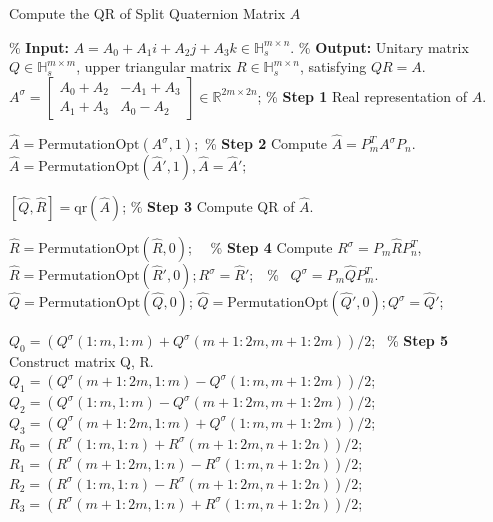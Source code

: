 \documentclass{book}
\theoremstyle{remark}
\begin{document}
\begin{algorithm}[htbp] 
    \caption{Compute the QR of Split Quaternion Matrix \(A\)}
    \label{alg:QR}
    \begin{algorithmic}[1]
        \State \% \textbf{Input:} \(A = A_0 + A_1 i + A_2 j + A_3 k \in \mathbb{H}_s^{m\times n}\).
        \State \% \textbf{Output:} Unitary matrix \(Q \in \mathbb{H}_s^{m\times m}\), upper triangular matrix \(R \in \mathbb{H}_s^{m\times n}\), satisfying \(Q  R = A\).
        \State \(A^\sigma = \begin{bmatrix}
            A_0 + A_2 & -A_1 + A_3 \\ 
            A_1 + A_3 & A_0 - A_2
            \end{bmatrix} \in \mathbb{R}^{2m\times 2n}\); \qquad\qquad\qquad\qquad \% \textbf{Step 1} Real representation of $A$.
        
        \State $\widehat{A}=\text{PermutationOpt}(A^\sigma,1);$  \qquad\qquad\qquad\qquad\qquad\qquad\quad\% \textbf{Step 2} Compute \(\widehat{A} = P_{m}^T A^\sigma P_{n}\).
        \State $\widehat{A}=\text{PermutationOpt}(\widehat{A}',1),\widehat{A}=\widehat{A}';$
        
        \State \([\widehat{Q},\widehat{R}] = \text{qr}(\widehat{A})\); \qquad\qquad\qquad\qquad\qquad\qquad\qquad\qquad\qquad\quad\% \textbf{Step 3} Compute QR of $\widehat{A}$.
        
        \State $\widehat{R}=\text{PermutationOpt}(\widehat{R},0)$; \qquad\qquad\qquad\qquad\qquad\qquad\quad\ \ \% \textbf{Step 4} Compute \(R^\sigma = P_{m}\widehat{R}P_{n}^T\), 
        \State $\widehat{R}=\text{PermutationOpt}(\widehat{R}',0);R^\sigma=\widehat{R}'$;\qquad\qquad\qquad\qquad\quad\ \ \% \qquad\quad \ \(Q^\sigma = P_{m}\widehat{Q}P_{m}^T\).
        \State $\widehat{Q}=\text{PermutationOpt}(\widehat{Q},0)$;
        \State $\widehat{Q}=\text{PermutationOpt}(\widehat{Q}',0);Q^\sigma=\widehat{Q}'$;
        
        \State $Q_0 = (Q^\sigma(1\!:\!m,1\!:\!m) + Q^\sigma(m+1\!:\!2m,m+1\!:\!2m))/2$; \qquad\ \% \textbf{Step 5} Construct matrix Q, R.
        \State $Q_1 = (Q^\sigma(m+1\!:\!2m,1\!:\!m) - Q^\sigma(1\!:\!m,m+1\!:\!2m))/2$;
        \State $Q_2 = (Q^\sigma(1\!:\!m,1\!:\!m) - Q^\sigma(m+1\!:\!2m,m+1\!:\!2m))/2$;
        \State $Q_3 = (Q^\sigma(m+1\!:\!2m,1\!:\!m) + Q^\sigma(1\!:\!m,m+1\!:\!2m))/2$;
        \State $R_0 = (R^\sigma(1\!:\!m,1\!:\!n) + R^\sigma(m+1\!:\!2m,n+1\!:\!2n))/2$;
        \State $R_1 = (R^\sigma(m+1\!:\!2m,1\!:\!n) - R^\sigma(1\!:\!m,n+1\!:\!2n))/2$;
        \State $R_2 = (R^\sigma(1\!:\!m,1\!:\!n) - R^\sigma(m+1\!:\!2m,n+1\!:\!2n))/2$;
        \State $R_3 = (R^\sigma(m+1\!:\!2m,1\!:\!n) + R^\sigma(1\!:\!m,n+1\!:\!2n))/2$;


\end{algorithmic}
\end{algorithm}
\end{document}
